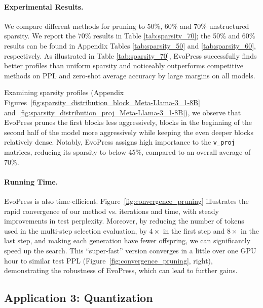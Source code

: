 \documentclass{article}
\theoremstyle{plain}
\theoremstyle{definition}
\theoremstyle{remark}
\newcommand{\methodname}{EvoPress}
\begin{document}


\paragraph{Experimental Results.} 
We compare different methods for pruning to 50\%, 60\% and 70\% unstructured sparsity. 
We report the 70\% results in Table \ref{tab:sparsity_70}; the  
50\% and 60\% results can be found in Appendix Tables \ref{tab:sparsity_50} and \ref{tab:sparsity_60}, respectively.
As illustrated in Table \ref{tab:sparsity_70}, \methodname{} successfully finds better profiles than uniform sparsity and noticeably outperforms competitive methods
on PPL and zero-shot average accuracy by large margins on all models.

Examining sparsity profiles (Appendix Figures~\ref{fig:sparsity_distribution_block_Meta-Llama-3_1-8B} and~\ref{fig:sparsity_distribution_proj_Meta-Llama-3_1-8B}), we observe that \methodname{} prunes the first blocks less aggressively, blocks in the beginning of the second half of the model more aggressively while keeping the even deeper blocks relatively dense. Notably, \methodname{} assigns high importance to the \texttt{v\_proj} matrices, reducing its sparsity to below 45\%, compared to an overall average of 70\%.

\paragraph{Running Time.} \methodname{} is also  time-efficient. Figure~\ref{fig:convergence_pruning} illustrates the rapid convergence of our method vs. iterations and time, with steady improvements in test perplexity. 
Moreover, by reducing the number of tokens used in the multi-step selection evaluation, by $4\times$ in the first step and $8\times$ in the last step, and making each generation have fewer offspring, we can significantly speed up the search. This ``super-fast'' version converges in a little over one GPU hour to similar test PPL (Figure~\ref{fig:convergence_pruning}, right), demonstrating the robustness of \methodname{}, which can lead to further gains.



\subsection{Application 3: Quantization}\label{subsect:quantization}
\end{document}
